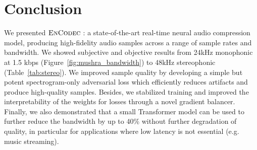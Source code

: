 \vspace{-0.1cm}
\section{Conclusion}
\label{sec:con}
\vspace{-0.1cm}
We presented $\textsc{EnCodec}~$: a state-of-the-art real-time neural audio compression model, producing high-fidelity audio samples across a range of sample rates and bandwidth. We showed subjective and objective results from 24kHz monophonic at 1.5 kbps (Figure~\ref{fig:mushra_bandwidth}) to 48kHz stereophonic (Table~\ref{tab:stereo}). 
We improved sample quality by developing a simple but potent spectrogram-only adversarial loss which efficiently reduces artifacts and produce high-quality samples. 
Besides, we stabilized training and improved the interpretability of the weights for losses through a novel gradient balancer. 
Finally, we also demonstrated that a small Transformer model can be used to further reduce the bandwidth by up to 40\% without further
degradation of quality, in particular for applications where low latency is not essential (e.g. music streaming).
